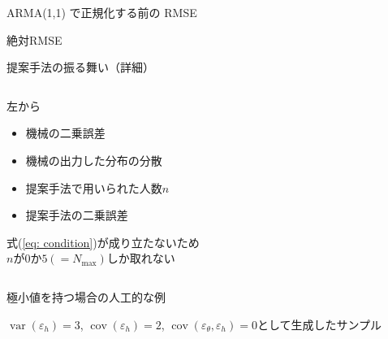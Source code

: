 \documentclass[dvipdfmx,aspectratio=169]{beamer}
\DeclareMathOperator{\var}{var}
\DeclareMathOperator{\cov}{cov}
\newcommand{\varh}{\var(\varepsilon_h)}
\newcommand{\covh}{\cov(\varepsilon_h)}
\newcommand{\covmh}{\cov(\varepsilon_\theta, \varepsilon_h)}
\begin{document}
\begin{frame}{ARMA(1,1) で正規化する前の RMSE}
\begin{table}
  \caption{絶対RMSE}
  \begin{center}
    \small
    
  \end{center}
\end{table}
\end{frame}

\begin{frame}{提案手法の振る舞い（詳細）}
\begin{columns}
  \begin{column}{0.4\textwidth}
    左から
    \begin{itemize}
      \item 機械の二乗誤差
      \item 機械の出力した分布の分散
      \item 提案手法で用いられた人数$n$
      \item 提案手法の二乗誤差
    \end{itemize}
    \medskip
    式(\ref{eq: condition})が成り立たないため\\
    $n$が$0$か$5 (= N_{\max})$しか取れない
  \end{column}
  \begin{column}{0.6\textwidth}
    \begin{table}
      \begin{center}
        \scriptsize
        
      \end{center}
    \end{table}
  \end{column}
\end{columns}
\end{frame}

\begin{frame}{極小値を持つ場合の人工的な例}
\begin{table}
  \caption{$\varh = 3$, $\covh = 2$, $\covmh = 0$として生成したサンプル}
  \begin{center}
    \small
    
  \end{center}
\end{table}
\end{frame}
\end{document}
